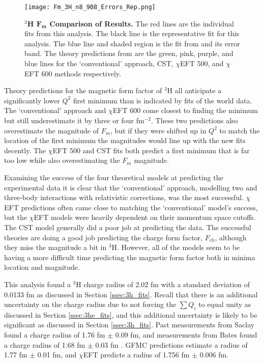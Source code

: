 \begin{figure}[!ht]
	\begin{center}
	\texttt{[image: Fm\_3H\_n8\_908\_Errors\_Rep.png]}
	\end{center}
	\caption[$^3$H $F_m$ Comparison of Results]{
	{\bf{$^3$H $\boldsymbol{F_m}$ Comparison of Results.}} The red lines are the individual fits from this analysis. The black line is the representative fit for this analysis. The blue line and shaded region is the fit from \cite{Article:Amroun} and its error band. The theory predictions from \cite{Article:Marcucci} are the green, pink, purple, and blue lines for the `conventional' approach, CST, $\chi$EFT 500, and $\chi$EFT 600 methods respectively.}
	\label{fig:3h_fm_theory}
\end{figure}

Theory predictions for the magnetic form factor of $^3$H all anticipate a significantly lower $Q^2$ first minimum than is indicated by fits of the world data. The `conventional' approach and $\chi$EFT 600 come closest to finding the minimum but still underestimate it by three or four fm$^{-2}$. These two predictions also overestimate the magnitude of $F_m$, but if they were shifted up in $Q^2$ to match the location of the first minimum the magnitudes would line up with the new fits decently. The $\chi$EFT 500 and CST fits both predict a first minimum that is far too low while also overestimating the $F_m$ magnitude. 

Examining the success of the four theoretical models at predicting the experimental data it is clear that the `conventional' approach, modelling two and three-body interactions with relativistic corrections, was the most successful. $\chi$EFT predictions often came close to matching the `conventional' model's success, but the $\chi$EFT models were heavily dependent on their momentum space cutoffs. The CST model generally did a poor job at predicting the data. The successful theories are doing a good job predicting the charge form factor, $F_{ch}$, although they miss the magnitude a bit in $^3$H. However, all of the models seem to be having a more difficult time predicting the magnetic form factor both in minima location and magnitude.

This analysis found a $^3$H charge radius of 2.02 fm with a standard deviation of 0.0133 fm as discussed in Section \ref{ssec:3h_fits}. Recall that there is an additional uncertainty on the charge radius due to not forcing the $\sum Q_i$ to equal unity as discussed in Section \ref{ssec:3he_fits}, and this additional uncertainty is likely to be significant as discussed in Section \ref{ssec:3h_fits}. Past measurements from Saclay found a charge radius of 1.76 fm $\pm$ 0.09 fm, and measurements from Bates found a charge radius of 1.68 fm $\pm$ 0.03 fm \cite{3h_proposal}. GFMC predictions estimate a radius of 1.77 fm $\pm$ 0.01 fm, and $\chi$EFT predicts a radius of 1.756 fm $\pm$ 0.006 fm. 

